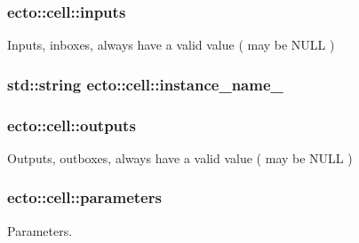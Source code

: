 \subsubsection[{inputs}]{ ecto\+::cell\+::inputs}\label{structecto_1_1cell_a65099b0458a7761b8bfa7a1ddc17e92f}


Inputs, inboxes, always have a valid value ( may be N\+U\+L\+L ) 

\hypertarget{structecto_1_1cell_a2bf4e65c7a699624c61d3b55cfac45ed}{}
\subsubsection[{instance\+\_\+name\+\_\+}]{\setlength{\rightskip}{0pt plus 5cm}std\+::string ecto\+::cell\+::instance\+\_\+name\+\_\+\hspace{0.3cm}{\ttfamily [private]}}\label{structecto_1_1cell_a2bf4e65c7a699624c61d3b55cfac45ed}
\hypertarget{structecto_1_1cell_a93951743b603faba35312ebdb07ceb22}{}
\subsubsection[{outputs}]{ ecto\+::cell\+::outputs}\label{structecto_1_1cell_a93951743b603faba35312ebdb07ceb22}


Outputs, outboxes, always have a valid value ( may be N\+U\+L\+L ) 

\hypertarget{structecto_1_1cell_ae00a91199c758cf7c24dcf0ecdf70a27}{}
\subsubsection[{parameters}]{ ecto\+::cell\+::parameters}\label{structecto_1_1cell_ae00a91199c758cf7c24dcf0ecdf70a27}


Parameters. 

\hypertarget{structecto_1_1cell_a9a9d7fa3bb72fd74073a997bfb6cbad8}{}
